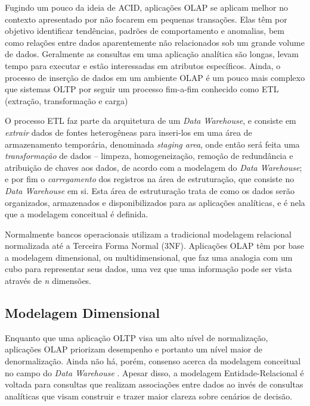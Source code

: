 \documentclass[conference]{IEEEtran}
\begin{document}
Fugindo um pouco da ideia de ACID, aplicações OLAP se aplicam melhor no contexto apresentado por não focarem em pequenas transações. Elas têm por objetivo identificar tendências, padrões de comportamento e anomalias, bem como relações entre dados aparentemente não relacionados \cite{codd1998providing} sob um grande volume de dados. Geralmente as consultas em uma aplicação analítica são longas, levam tempo para executar e estão interessadas em atributos específicos. Ainda, o processo de inserção de dados em um ambiente OLAP é um pouco mais complexo que sistemas OLTP por seguir um processo fim-a-fim conhecido como ETL (extração, transformação e carga) \cite{vertabelo2017olap}

O processo ETL faz parte da arquitetura de um \textit{Data Warehouse}, e consiste em \textit{extrair} dados de fontes heterogêneas para inseri-los em uma área de armazenamento temporária, denominada \textit{staging area}, onde então será feita uma \textit{transformação} de dados -- limpeza, homogeneização, remoção de redundância e atribuição de chaves aos dados, de acordo com a modelagem do \textit{Data Warehouse}; e por fim o \textit{carregamento} dos registros na área de estruturação, que consiste no \textit{Data Warehouse} em si. Esta área de estruturação trata de como os dados serão organizados, armazenados e disponibilizados para as aplicações analíticas, e é nela que a modelagem conceitual é definida.

Normalmente bancos operacionais utilizam a tradicional modelagem relacional normalizada até a Terceira Forma Normal (3NF). Aplicações OLAP têm por base a modelagem dimensional, ou multidimensional, que faz uma analogia com um cubo para representar seus dados, uma vez que uma informação pode ser vista através de \textit{n} dimensões.



\subsection{Modelagem Dimensional}

Enquanto que uma aplicação OLTP visa um alto nível de normalização, aplicações OLAP priorizam desempenho e portanto um nível maior de denormalização. Ainda não há, porém, consenso acerca da modelagem conceitual no campo do \textit{Data Warehouse} \cite{sen2005comparison}. Apesar disso, a modelagem Entidade-Relacional é voltada para consultas que realizam associações entre dados ao invés de consultas analíticas \cite{kimball2002dw} que visam construir e trazer maior clareza sobre cenários de decisão.
\end{document}
